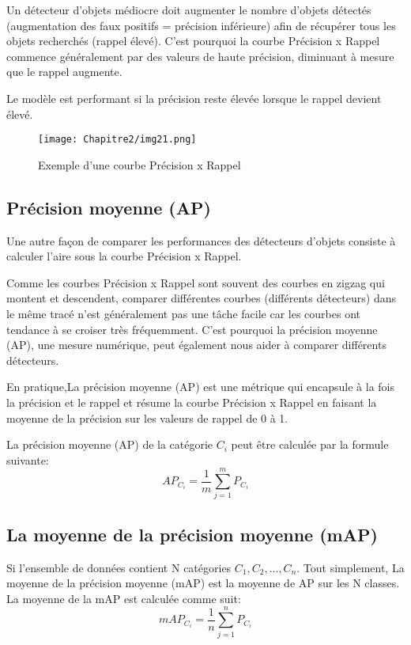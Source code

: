           Un détecteur d'objets médiocre doit augmenter le nombre d'objets détectés (augmentation des faux positifs = précision inférieure) afin de récupérer tous les objets recherchés (rappel élevé). C'est pourquoi la courbe Précision x Rappel commence généralement par des valeurs de haute précision, diminuant à mesure que le rappel augmente.
          
          Le modèle est performant si la précision reste élevée lorsque le rappel devient élevé.
          \begin{figure}[H]
               \centering
               \texttt{[image: Chapitre2/img21.png]}
               \caption{Exemple d'une courbe Précision x Rappel}
               \label{img21}
               \end{figure}
          
          \subsection{Précision moyenne (AP)}
          Une autre façon de comparer les performances des détecteurs d'objets consiste à calculer l'aire sous la courbe Précision x Rappel.
          
  Comme les courbes Précision x Rappel sont souvent des courbes en zigzag qui montent et descendent, comparer différentes courbes (différents détecteurs) dans le même tracé n'est généralement pas une tâche facile car les courbes ont tendance à se croiser très fréquemment. C'est pourquoi la précision moyenne (AP), une mesure numérique, peut également nous aider à comparer différents détecteurs. 
  
En pratique,La précision moyenne (AP) est une métrique qui encapsule à la fois la précision et le rappel et résume la courbe Précision x Rappel en faisant la moyenne de la précision sur les valeurs de rappel de 0 à 1. 
          
          La précision moyenne (AP) de la catégorie $C_i$ peut être calculée par la formule suivante:
          \begin{equation}
          AP_{C_i} = \frac{1}{m} \sum^{m}_{j=1} P_{C_i}
          \end{equation}
         

          \subsection{La moyenne de la précision moyenne (mAP)}
Si l'ensemble de données contient N catégories ${C_1, C_2, ... , C_n}$. Tout simplement, La moyenne de la précision moyenne (mAP) est la moyenne de AP sur les N classes.   La moyenne de la mAP  est calculée comme suit: 
\begin{equation}
    mAP_{C_i} = \frac{1}{n} \sum^{n}_{j=1} P_{C_i}
     \end{equation}     
         
